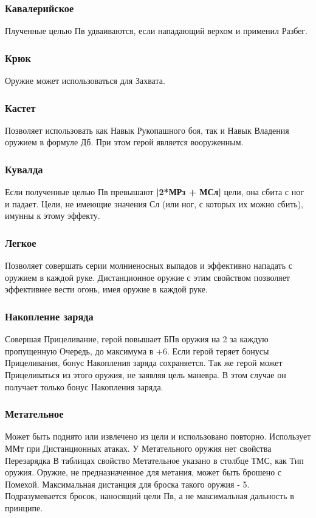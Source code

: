 \subsubsection{Кавалерийское} Плученные целью Пв удваиваются, если нападающий верхом и применил Разбег.
\subsubsection{Крюк} Оружие может использоваться для Захвата.
\subsubsection{Кастет} Позволяет использовать как Навык Рукопашного боя, так и Навык Владения оружием в формуле Дб. При этом герой является вооруженным.
\subsubsection{Кувалда} Если полученные целью Пв превышают \textbf{|2*МРз + МСл|} цели, она сбита с ног и падает. Цели, не имеющие значения Сл (или ног, с которых их можно сбить), имунны к этому эффекту. 
\subsubsection{Легкое} Позволяет совершать серии молниеносных выпадов и эффективно нападать с оружием в каждой руке.
\newline Дистанционное оружие с этим свойством позволяет эффективнее вести огонь, имея оружие в каждой руке.
\subsubsection{Накопление заряда} Совершая Прицеливание, герой повышает БПв оружия на 2 за каждую пропущенную Очередь, до максимума в +6. Если герой теряет бонусы Прицеливания, бонус Накопления заряда сохраняется. 
\newline Так же герой может Прицеливаться из этого оружия, не заявляя цель маневра. В этом случае он получает только бонус Накопления заряда.
\subsubsection{Метательное} Может быть поднято или извлечено из цели и использовано повторно. Использует ММт при Дистанционных атаках. 
\newline У Метательного оружия нет свойства Перезарядка 
\newline В таблицах свойство Метательное указано в столбце ТМС, как Тип оружия.
\newline Оружие, не предназначенное для метания, может быть брошено с Помехой. Максимальная дистанция для броска такого оружия - 5. Подразумевается бросок, наносящий цели Пв, а не максимальная дальность в принципе.
